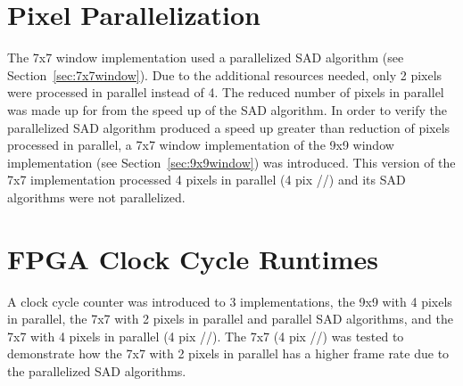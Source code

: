 
\section{Pixel Parallelization}
\label{sec:7x7pixelParallel4}

The 7x7 window implementation used a parallelized SAD algorithm (see Section~\ref{sec:7x7window}). Due to the additional resources needed, only 2 pixels were processed in parallel instead of 4. The reduced number of pixels in parallel was made up for from the speed up of the SAD algorithm. In order to verify the parallelized SAD algorithm produced a speed up greater than reduction of pixels processed in parallel, a 7x7 window implementation of the 9x9 window implementation (see Section~\ref{sec:9x9window}) was introduced. This version of the 7x7 implementation processed 4 pixels in parallel (4 pix //) and its SAD algorithms were not parallelized.

\section{FPGA Clock Cycle Runtimes}

A clock cycle counter was introduced to 3 implementations, the 9x9 with 4 pixels in parallel, the 7x7 with 2 pixels in parallel and parallel SAD algorithms, and the 7x7 with 4 pixels in parallel (4 pix //). The 7x7 (4 pix //) was tested to demonstrate how the 7x7 with 2 pixels in parallel has a higher frame rate due to the parallelized SAD algorithms. 

